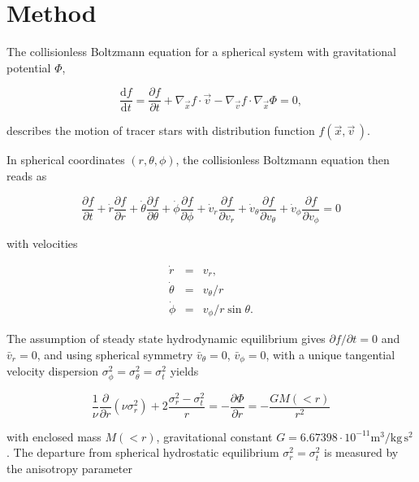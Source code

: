 \section{Method}\label{sec:method}


The collisionless Boltzmann equation for a spherical system with
gravitational potential $\Phi$,

\begin{equation}
\frac{\text{d}f}{\text{d}t} = \frac{\partial f}{\partial t} + \nabla_{\vec{x}} f\cdot\vec{v} - \nabla_{\vec{v}} f\cdot\nabla_{\vec{x}}\Phi = 0,
\end{equation}

describes the motion of tracer stars with distribution function
$f(\vec{x},\vec{v}\,)$.


In spherical coordinates $(r, \theta, \phi)$, the collisionless
Boltzmann equation then reads as

\begin{equation}
\frac{\partial f}{\partial t} + \dot{r}\frac{\partial f}{\partial r} + \dot{\theta}\frac{\partial f}{\partial \theta} + \dot{\phi}\frac{\partial f}{\partial \phi} + \dot{v}_r\frac{\partial f}{\partial v_r}+\dot{v}_\theta\frac{\partial f}{\partial v_\theta} +\dot{v}_\phi\frac{\partial f}{\partial v_\phi} = 0
\end{equation}

with velocities

\begin{eqnarray}
\dot{r}       &=& v_r,\\
\dot{\theta}  &=& v_\theta/r\\
\dot{\phi}    &=& v_\phi / r \sin\theta.
\end{eqnarray}

The assumption of steady state hydrodynamic equilibrium gives
$\partial f/\partial t=0$ and $\bar{v}_r=0$, and using spherical
symmetry $\bar{v}_\theta=0$, $\bar{v}_\phi=0$, with a unique
tangential velocity dispersion
$\sigma_\phi^2=\sigma_\theta^2=\sigma_t^2$ yields

\begin{equation}\label{eq:Jeans}
\frac{1}{\nu}\frac{\partial}{\partial r}(\nu\sigma_{r}^2) + 2\frac{\sigma_{r}^2-\sigma_{t}^2}{r} = -\frac{\partial \Phi}{\partial r} = -\frac{GM(<r)}{r^2}
\end{equation}

with enclosed mass $M(<r)$, gravitational constant $G =
6.67398\cdot10^{-11} \text{m}^3/\text{kg}\,\text{s}^2$. The departure
from spherical hydrostatic equilibrium $\sigma_r^2=\sigma_t^2$ is
measured by the anisotropy parameter

